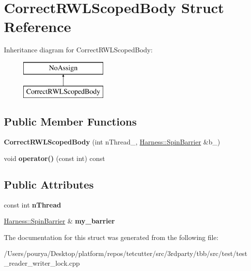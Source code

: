 \hypertarget{structCorrectRWLScopedBody}{}\section{Correct\+R\+W\+L\+Scoped\+Body Struct Reference}
\label{structCorrectRWLScopedBody}
Inheritance diagram for Correct\+R\+W\+L\+Scoped\+Body\+:\begin{figure}[H]
\begin{center}
\leavevmode
\includegraphics[height=2.000000cm]{structCorrectRWLScopedBody}
\end{center}
\end{figure}
\subsection*{Public Member Functions}
\begin{DoxyCompactItemize}
\item 
\hypertarget{structCorrectRWLScopedBody_a5205214473b1d10ee23955672a5a5e16}{}{\bfseries Correct\+R\+W\+L\+Scoped\+Body} (int n\+Thread\+\_\+, \hyperlink{classHarness_1_1SpinBarrier}{Harness\+::\+Spin\+Barrier} \&b\+\_\+)\label{structCorrectRWLScopedBody_a5205214473b1d10ee23955672a5a5e16}

\item 
\hypertarget{structCorrectRWLScopedBody_a882c98edfba1be0e3f9e3474d05df370}{}void {\bfseries operator()} (const int) const \label{structCorrectRWLScopedBody_a882c98edfba1be0e3f9e3474d05df370}

\end{DoxyCompactItemize}
\subsection*{Public Attributes}
\begin{DoxyCompactItemize}
\item 
\hypertarget{structCorrectRWLScopedBody_a502202c4bb5cd599e187e666f2b90d82}{}const int {\bfseries n\+Thread}\label{structCorrectRWLScopedBody_a502202c4bb5cd599e187e666f2b90d82}

\item 
\hypertarget{structCorrectRWLScopedBody_a02925d2432efedcea70a52c3def26661}{}\hyperlink{classHarness_1_1SpinBarrier}{Harness\+::\+Spin\+Barrier} \& {\bfseries my\+\_\+barrier}\label{structCorrectRWLScopedBody_a02925d2432efedcea70a52c3def26661}

\end{DoxyCompactItemize}


The documentation for this struct was generated from the following file\+:\begin{DoxyCompactItemize}
\item 
/\+Users/pourya/\+Desktop/platform/repos/tetcutter/src/3rdparty/tbb/src/test/test\+\_\+reader\+\_\+writer\+\_\+lock.\+cpp\end{DoxyCompactItemize}
